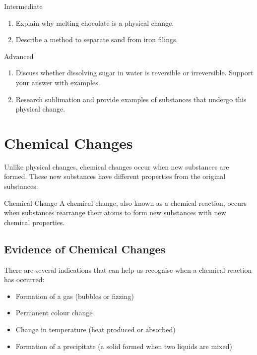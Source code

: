 \begin{tieredquestions}{Intermediate}
\begin{enumerate}
\item Explain why melting chocolate is a physical change.
\item Describe a method to separate sand from iron filings.
\end{enumerate}
\end{tieredquestions}

\begin{tieredquestions}{Advanced}
\begin{enumerate}
\item Discuss whether dissolving sugar in water is reversible or irreversible. Support your answer with examples.
\item Research sublimation and provide examples of substances that undergo this physical change.
\end{enumerate}
\end{tieredquestions}

\section{Chemical Changes}

Unlike physical changes, chemical changes occur when new substances are formed. These new substances have different properties from the original substances.

\begin{keyconcept}{Chemical Change}
A chemical change, also known as a chemical reaction, occurs when substances rearrange their atoms to form new substances with new chemical properties.
\end{keyconcept}

\subsection{Evidence of Chemical Changes}

There are several indications that can help us recognise when a chemical reaction has occurred:

\begin{itemize}
\item Formation of a gas (bubbles or fizzing)
\item Permanent colour change
\item Change in temperature (heat produced or absorbed)
\item Formation of a precipitate (a solid formed when two liquids are mixed)
\end{itemize}

